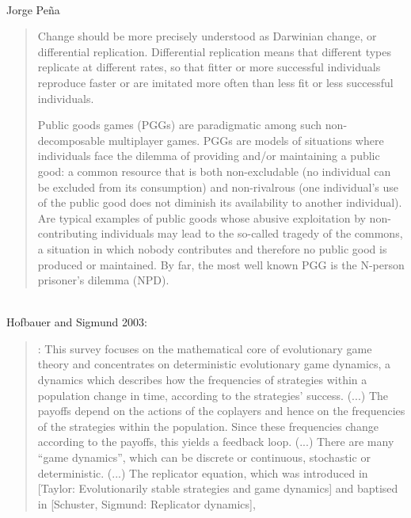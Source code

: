 \documentclass[a4paper,10pt]{article}
\begin{document}
\\

Jorge Peña
\begin{quotation}
    Change should be more precisely understood as Darwinian change, or differential replication.
    Differential replication means that different types replicate at different rates, so that fitter or more successful individuals reproduce faster or are imitated more often than less fit or less successful individuals.

    Public goods games (PGGs) are paradigmatic among such non-decomposable multiplayer games.
    PGGs are models of situations where individuals face the dilemma of providing and/or maintaining a public good: a common resource that is both non-excludable (no individual can be excluded from its consumption) and non-rivalrous (one individual’s use of the public good does not diminish its availability to another individual).
    Are typical examples of public goods whose abusive exploitation by non-contributing individuals may lead to the so-called tragedy of the commons, a situation in which nobody contributes and therefore no public good is produced or maintained.
    By far, the most well known PGG is the N-person prisoner’s dilemma (NPD). \cite{pena2012-phd}
\end{quotation}

\\

Hofbauer and Sigmund 2003:
\begin{quotation} \cite{hofbauer2003-evolutionaryGameDynamics}:
    This survey focuses on the mathematical core of evolutionary game theory and concentrates on deterministic evolutionary game dynamics, a dynamics which describes how the frequencies of strategies within a population change in time, according to the strategies' success.
    (...)
    The payoffs depend on the actions of the coplayers and hence on the frequencies of the strategies within the population. Since these frequencies change according to the payoffs, this yields a feedback loop.
    (...)
    There are many ``game dynamics'', which can be discrete or continuous, stochastic or deterministic.
    (...)
    The replicator equation, which was introduced in [Taylor: Evolutionarily stable strategies and game dynamics] and baptised in [Schuster, Sigmund: Replicator dynamics],
\end{quotation}


\\
\end{document}
